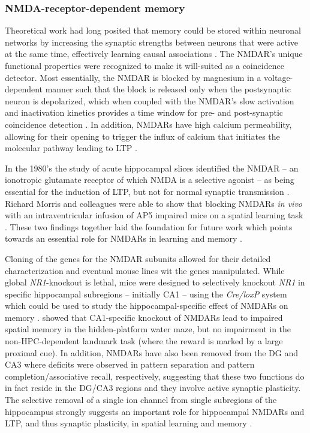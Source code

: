 \subsubsection{NMDA-receptor-dependent memory}
\label{sec:intro:memory:NMDAR}
Theoretical work had long posited that memory could be stored within neuronal networks by increasing the synaptic strengths between neurons that were active at the same time, effectively learning causal associations \citep{Hebb1949, Marr1971}.
The \ac{NMDAR}'s unique functional properties were recognized to make it will-suited as a coincidence detector.
Most essentially, the \ac{NMDAR} is blocked by magnesium in a voltage-dependent manner such that the block is released only when the postsynaptic neuron is depolarized, which when coupled with the \ac{NMDAR}'s slow activation and inactivation kinetics provides a time window for pre- and post-synaptic coincidence detection \citep[reviewed in][]{Bliss1993}.
In addition, \ac{NMDAR}s have high calcium permeability, allowing for their opening to trigger the influx of calcium that initiates the molecular pathway leading to \ac{LTP} \citep{Bailey2008}.

In the 1980's the study of acute hippocampal slices identified the \ac{NMDAR} -- an ionotropic glutamate receptor of which \ac{NMDA} is a selective agonist -- as being essential for the induction of \ac{LTP}, but not for normal synaptic transmission \citep{Collingridge1983}.
Richard Morris and colleagues were able to show that blocking \acs{NMDAR}s \emph{in vivo} with an intraventricular infusion of \ac{AP5} impaired mice on a spatial learning task \citep{Morris1986}.
These two findings together laid the foundation for future work which points towards an essential role for \ac{NMDAR}s in learning and memory \citep{Morris2013}.

Cloning of the genes for the \ac{NMDAR} subunits \citep{Moriyoshi1991} allowed for their detailed characterization and eventual mouse lines wit the genes manipulated.
While global \emph{NR1}-knockout is lethal, mice were designed to selectively knockout \emph{NR1} in specific hippocampal subregions -- initially CA1 -- using the \emph{Cre/loxP} system which could be used to study the hippocampal-specific effect of \ac{NMDAR}s on memory \citep{Tsien1996}.
\citeauthor{Tsien1996} showed that CA1-specific knockout of \ac{NMDAR}s lead to impaired spatial memory in the hidden-platform water maze, but no impairment in the non-\acs{HPC}-dependent landmark task (where the reward is marked by a large proximal cue).
In addition, \ac{NMDAR}s have also been removed from the \ac{DG} \citep{McHugh2007} and CA3 \citep{Nakazawa2002} where deficits were observed in pattern separation and pattern completion/associative recall, respectively, suggesting that these two functions do in fact reside in the DG/CA3 regions and they involve active synaptic plasticity.
The selective removal of a single ion channel from single subregions of the hippocampus strongly suggests an important role for hippocampal \ac{NMDAR}s and \ac{LTP}, and thus synaptic plasticity, in spatial learning and memory \citep{Tsien1996}.

